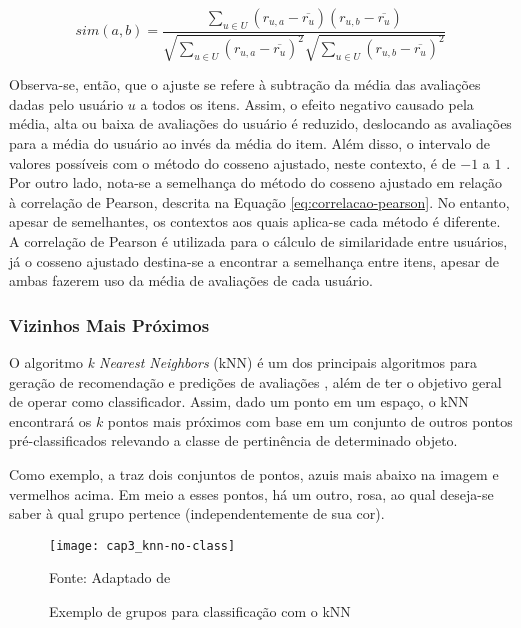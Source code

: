         \begin{equation}
             sim(a, b) = \frac{\sum_{u\in U}(r_{u, a}-\overline{r_u})(r_{u, b}-\overline{r_u})}{\sqrt{\sum_{u\in U}(r_{u, a}-\overline{r_u})^2}\sqrt{\sum_{u\in U}(r_{u, b}-\overline{r_u})^2}} \label{eq:sim-cosseno-ajustado}
        \end{equation}
        
        Observa-se, então, que o ajuste se refere à subtração da média das avaliações dadas pelo usuário $u$ a todos os itens. Assim, o efeito negativo causado pela média, alta ou baixa de avaliações do usuário é reduzido, deslocando as avaliações para a média do usuário ao invés da média do item. Além disso, o intervalo de valores possíveis com o método do cosseno ajustado, neste contexto, é de $-1$ a $1$ \cite{Jannach2010, Ricci2010}. Por outro lado, nota-se a semelhança do método do cosseno ajustado em relação à correlação de Pearson, descrita na Equação \ref{eq:correlacao-pearson}. No entanto, apesar de semelhantes, os contextos aos quais aplica-se cada método é diferente. A correlação de Pearson é utilizada para o cálculo de similaridade entre usuários, já o cosseno ajustado destina-se a encontrar a semelhança entre itens, apesar de ambas fazerem uso da média de avaliações de cada usuário.
        
        \ProximoForaDoSumario
        \subsubsection{Vizinhos Mais Próximos}
            
            O algoritmo \textit{k Nearest Neighbors} (kNN) é um dos principais algoritmos para geração de recomendação e predições de avaliações \cite{Bobadilla_2013}, além de ter o objetivo geral de operar como classificador. Assim, dado um ponto em um espaço, o kNN encontrará os $k$ pontos mais próximos com base em um conjunto de outros pontos pré-classificados relevando a classe de pertinência de determinado objeto. 
            
            Como exemplo, a  traz dois conjuntos de pontos, azuis mais abaixo na imagem e vermelhos acima. Em meio a esses pontos, há um outro, rosa, ao qual deseja-se saber à qual grupo pertence (independentemente de sua cor).             
            
            \begin{figure}[htb]
                \caption{Exemplo de grupos para classificação com o kNN}
                \texttt{[image: cap3\_knn-no-class]}
                \label{fig:cap3_knn-no-class}
                
                {\footnotesize Fonte: Adaptado de }
            \end{figure}
                        
